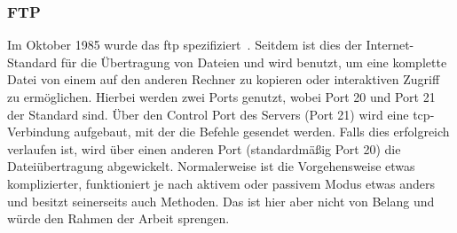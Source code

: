 	\subsubsection{FTP}\label{subsubsec:ftp}
		Im Oktober 1985 wurde das \gls{ftp} spezifiziert~\cite[Vgl.][]{rfc959}.
		Seitdem ist dies der Internet-Standard für die Übertragung von Dateien und wird benutzt,
		um eine komplette Datei von einem auf den anderen Rechner zu kopieren
		oder interaktiven Zugriff zu ermöglichen.
		Hierbei werden zwei Ports genutzt,
		wobei Port 20 und Port 21 der Standard sind.
		Über den Control Port des Servers (Port 21) wird eine \gls{tcp}-Verbindung aufgebaut,
		mit der die Befehle gesendet werden.
		Falls dies erfolgreich verlaufen ist,
		wird über einen anderen Port (standardmäßig Port 20) die Dateiübertragung abgewickelt.
		Normalerweise ist die Vorgehensweise etwas komplizierter,
		funktioniert je nach aktivem oder passivem Modus etwas anders und besitzt seinerseits auch Methoden.
		Das ist hier aber nicht von Belang und würde den Rahmen der Arbeit sprengen.